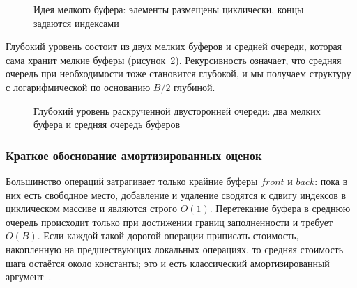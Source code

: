 \documentclass[14pt, russian]{scrartcl}
\begin{document}
\begin{figure}[!htb]
\centering
{}
\caption{Идея мелкого буфера: элементы размещены циклически, концы задаются индексами}
\label{fig:shallow_ring}
\end{figure}

Глубокий уровень состоит из двух мелких буферов и средней очереди, которая
сама хранит мелкие буферы (рисунок~\ref{fig:deep_deque}). Рекурсивность
означает, что средняя очередь при необходимости тоже становится глубокой,
и мы получаем структуру с логарифмической по основанию \(B/2\) глубиной.

\begin{figure}[!htb]
\centering
{}
\caption{Глубокий уровень раскрученной двусторонней очереди: два мелких буфера и средняя очередь буферов}
\label{fig:deep_deque}
\end{figure}

\subsubsection{Краткое обоснование амортизированных оценок}

Большинство операций затрагивает только крайние буферы \(front\) и
\(back\): пока в них есть свободное место, добавление и удаление
сводятся к сдвигу индексов в циклическом массиве и являются строго
\(O(1)\). Перетекание буфера в среднюю очередь происходит только при
достижении границ заполненности и требует \(O(B)\). Если каждой такой
дорогой операции приписать стоимость, накопленную на предшествующих
локальных операциях, то средняя стоимость шага остаётся около константы;
это и есть классический амортизированный аргумент~\cite{okasaki_pfds}.
\end{document}

